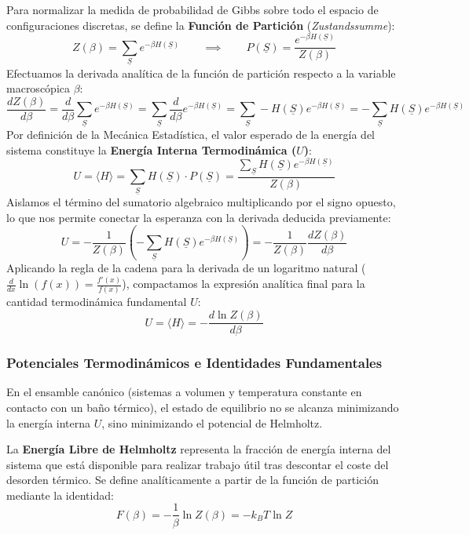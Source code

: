 \noindent 
Para normalizar la medida de probabilidad de Gibbs sobre todo el espacio de configuraciones discretas, se define la \textbf{Función de Partición} (\textit{Zustandssumme}):
\[
Z(\beta) = \sum_{\underline{S}} e^{-\beta H(\underline{S})} \qquad \implies \qquad P(\underline{S}) = \frac{e^{-\beta H(\underline{S})}}{Z(\beta)}
\]
Efectuamos la derivada analítica de la función de partición respecto a la variable macroscópica $\beta$:
\[
\frac{dZ(\beta)}{d\beta} = \frac{d}{d\beta} \sum_{\underline{S}} e^{-\beta H(\underline{S})} = \sum_{\underline{S}} \frac{d}{d\beta} e^{-\beta H(\underline{S})} = \sum_{\underline{S}} -H(\underline{S}) e^{-\beta H(\underline{S})} = -\sum_{\underline{S}} H(\underline{S}) e^{-\beta H(\underline{S})}
\]
Por definición de la Mecánica Estadística, el valor esperado de la energía del sistema constituye la \textbf{Energía Interna Termodinámica ($U$)}:
\[
U = \langle H \rangle = \sum_{\underline{S}} H(\underline{S}) \cdot P(\underline{S}) = \frac{\sum_{\underline{S}} H(\underline{S}) e^{-\beta H(\underline{S})}}{Z(\beta)}
\]
Aislamos el término del sumatorio algebraico multiplicando por el signo opuesto, lo que nos permite conectar la esperanza con la derivada deducida previamente:
\[
U = -\frac{1}{Z(\beta)} \left( -\sum_{\underline{S}} H(\underline{S}) e^{-\beta H(\underline{S})} \right) = -\frac{1}{Z(\beta)} \frac{dZ(\beta)}{d\beta}
\]
Aplicando la regla de la cadena para la derivada de un logaritmo natural ($\frac{d}{dx} \ln(f(x)) = \frac{f'(x)}{f(x)}$), compactamos la expresión analítica final para la cantidad termodinámica fundamental $U$:
\[
\boxed{U = \langle H \rangle = -\frac{d \ln Z(\beta)}{d\beta}}
\]


\subsubsection{Potenciales Termodinámicos e Identidades Fundamentales}

\noindent
En el ensamble canónico (sistemas a volumen y temperatura constante en contacto con un baño térmico), el estado de equilibrio no se alcanza minimizando la energía interna $U$, sino minimizando el potencial de Helmholtz.

\begin{definicion}
    La \textbf{Energía Libre de Helmholtz} representa la fracción de energía interna del sistema que está disponible para realizar trabajo útil tras descontar el coste del desorden térmico. Se define analíticamente a partir de la función de partición mediante la identidad:
    \[
    F(\beta) = -\frac{1}{\beta} \ln Z(\beta) = -k_B T \ln Z
    \]
\end{definicion}

